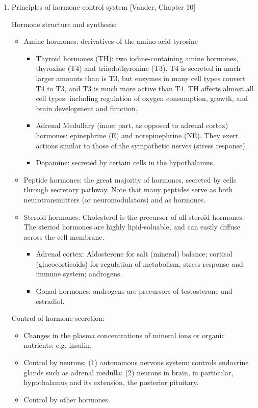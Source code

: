 \documentclass{report}
\begin{document}
\begin{enumerate}
\item{Principles of hormone control system} [Vander, Chapter 10]

Hormone structure and synthesis: 
\begin{itemize}
\item Amine hormones: derivatives of the amino acid tyrosine
\begin{itemize}
	\item Thyroid hormones (TH): two iodine-containing amine hormones, thyroxine (T4) and triiodothyronine (T3). T4 is secreted in much larger amounts than is T3, but enzymes in many cell types convert T4 to T3, and T3 is much more active than T4. TH affects almost all cell types: including regulation of oxygen consumption, growth, and brain development and function. 
	\item Adrenal Medullary (inner part, as opposed to adrenal cortex) hormones: epinephrine (E) and norepinephrine (NE). They exert actions similar to those of the sympathetic nerves (stress response). 
	\item Dopamine: secreted by certain cells in the hypothalamus. 
\end{itemize}

\item Peptide hormones: the great majority of hormones, secreted by cells through secretory pathway. Note that many peptides serve as both neurotransmitters (or neuromodulators) and as hormones.

\item Steroid hormones: Cholesterol is the precursor of all steroid hormones. The steriod hormones are highly lipid-soluable, and can easily diffuse across the cell membrane. 
\begin{itemize}
\item Adrenal cortex: Aldosterone for salt (mineral) balance; cortisol (glucocorticoids) for regulation of metabolism, stress response and immune system; androgens. 
\item Gonad hormones: androgens are precursors of testosterone and estradiol. 
\end{itemize}
\end{itemize}

Control of hormone secretion: 
\begin{itemize}
\item Changes in the plasma concentrations of mineral ions or organic nutrients: e.g. insulin. 
\item Control by neurons: (1) autonomous nervous system: controls endocrine glands such as adrenal medulla; (2) neurons in brain, in particular, hypothalamus and its extension, the posterior pituitary. 
\item Control by other hormones. 
\end{itemize}


\end{enumerate}
\end{document}
